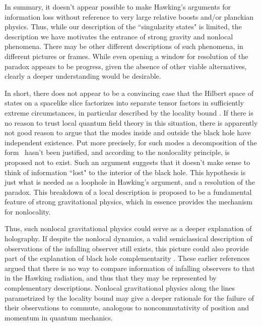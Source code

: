 In summary, it doesn't appear possible to make Hawking's arguments for information loss without
reference to very large relative boosts and/or planckian physics. Thus, while our description of the ``singularity states" is limited, the description we have motivates the entrance of strong gravity and nonlocal phenomena.  There may be other different descriptions of such  phenomena, in different pictures or frames.
While even opening a window for resolution of the paradox appears to be progress, given the absence of other viable alternatives, clearly a deeper understanding would be desirable.





In short, there does not appear to be a convincing case that the Hilbert space of states on a spacelike slice factorizes into separate tensor factors in sufficiently extreme circumstances, in particular described by the locality bound \locbd.  If there is no reason to trust local quantum field theory in this situation, there is apparently not  good reason to argue that the modes inside and outside the black hole have independent existence.  Put more precisely, for such modes a decomposition of the form \hilbprod\ hasn't been justified, and according to the nonlocality principle, is proposed not to exist.
Such an argument suggests that it doesn't make sense to think of  information ``lost" to the interior of the black hole.
This hypothesis is just what is needed as a loophole in Hawking's argument, and a resolution of the paradox.  This breakdown of a local description is proposed to be a fundamental feature of strong gravitational physics, which in essence provides the mechanism for nonlocality.


Thus, such nonlocal gravitational physics could serve as a deeper explanation of holography.  If despite the nonlocal dynamics, a valid semiclassical description of observations of the infalling observer still exists, this
 picture could also provide part of the explanation of black hole complementarity .   These earlier references argued that
there is no way to compare information of infalling observers to that in the Hawking radiation, and thus that they may be represented by complementary descriptions.   Nonlocal gravitational physics along the lines parametrized by the locality bound may give a deeper rationale for the failure of their observations to commute, analogous to noncommutativity of position and momentum in quantum mechanics.

